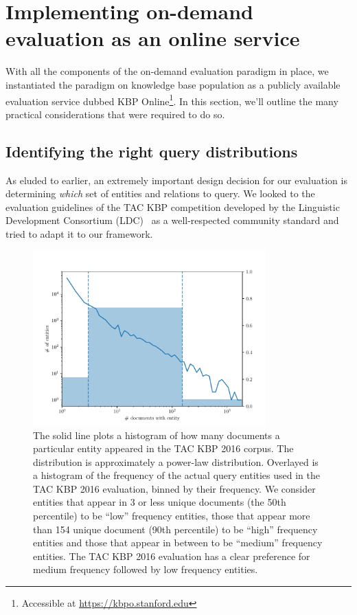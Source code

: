 \section{\label{sec:kbpo:kbpo} Implementing on-demand evaluation as an online service}

With all the components of the on-demand evaluation paradigm in place, we instantiated the paradigm on knowledge base population as a publicly available evaluation service dubbed KBP Online\footnote{Accessible at \url{https://kbpo.stanford.edu}}.
In this section, we'll outline the many practical considerations that were required to do so.

\subsection{Identifying the right query distributions}
As eluded to earlier, an extremely important design decision for our evaluation is determining \textit{which} set of entities and relations to query.
We looked to the evaluation guidelines of the TAC KBP competition developed by the Linguistic Development Consortium (LDC)~\citep{ellis2015tackbp,mayfield2012evaluating} as a well-respected community standard and tried to adapt it to our framework.

\begin{figure}
  \centering
  \includegraphics[width=0.8\textwidth]{figures/analysis/distribution}
  \caption[TAC KBP 2016 Query entity distribution]{\label{fig:kbpo:distribution}
    The solid line plots a histogram of how many documents a particular entity appeared in the TAC KBP 2016 corpus.
    The distribution is approximately a power-law distribution.
    Overlayed is a histogram of the frequency of the actual query entities used in the TAC KBP 2016 evaluation, binned by their frequency. We consider entities that appear in 3 or less unique documents (the 50th percentile) to be ``low'' frequency entities, those that appear more than 154 unique document (90th percentile) to be ``high'' frequency entities and those that appear in between to be ``medium'' frequency entities.
    The TAC KBP 2016 evaluation has a clear preference for medium frequency followed by low frequency entities.
  }
\end{figure}

